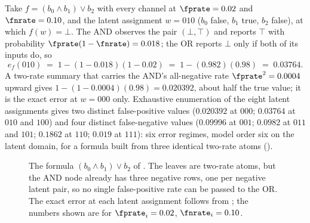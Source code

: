 \begin{example}
\label{ex:two-rate-counterexample}
Take $f = (b_0 \wedge b_1) \vee b_2$ with every channel at $\fprate = 0.02$ and
$\fnrate = 0.10$, and the latent assignment $w = 010$ ($b_0$ false, $b_1$ true,
$b_2$ false), at which $f(w) = \bot$. The AND observes the pair $(\bot, \top)$
and reports $\top$ with probability $\fprate(1 - \fnrate) = 0.018$; the OR
reports $\bot$ only if both of its inputs do, so
\[
  e_f(010) \;=\; 1 - (1 - 0.018)(1 - 0.02) \;=\; 1 - (0.982)(0.98) \;=\; 0.03764.
\]
A two-rate summary that carries the AND's all-negative rate $\fprate^2 = 0.0004$
upward gives $1 - (1 - 0.0004)(0.98) = 0.020392$, about half the true value; it
is the exact error at $w = 000$ only. Exhaustive enumeration of the eight
latent assignments gives two distinct false-positive values ($0.020392$ at
$000$; $0.03764$ at $010$ and $100$) and four distinct false-negative values
($0.09996$ at $001$; $0.0982$ at $011$ and $101$; $0.1862$ at $110$; $0.019$ at
$111$): six error regimes, model order six on the latent domain, for a formula
built from three identical two-rate atoms ().
\end{example}

\begin{figure}[tbp]
\centering
{}
\caption[A two-rate summary fails on $(b_0 \wedge b_1) \vee b_2$]{The formula $(b_0 \wedge b_1) \vee b_2$ of
. The leaves are two-rate atoms, but the AND
node already has three negative rows, one per negative latent pair, so no single
false-positive rate can be passed to the OR. The exact error at each latent
assignment follows from ; the numbers shown are
for $\fprate_i = 0.02$, $\fnrate_i = 0.10$.}
\label{fig:latent-tree}
\end{figure}

